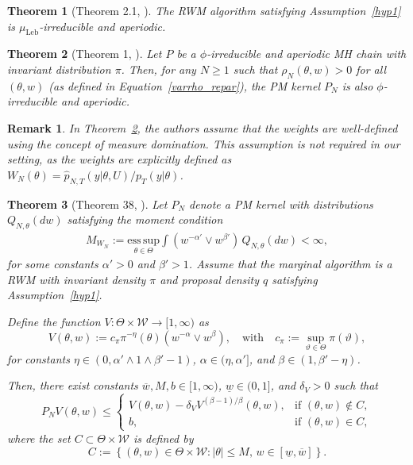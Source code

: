 \documentclass[pdflatex,sn-mathphys-num]{sn-jnl}
\renewcommand{\geq}{\geqslant}
\renewcommand{\leq}{\leqslant}
\theoremstyle{thmstyleone}
\newtheorem{theorem}{Theorem}
\theoremstyle{thmstyletwo}
\newtheorem{remark}{Remark}
\theoremstyle{thmstylethree}
\begin{document}
\begin{theorem}[Theorem 2.1, \cite{jarner_geometric_2000}]
The RWM algorithm satisfying Assumption~\ref{hyp1} is $\mu_{\text{Leb}}$-irreducible and aperiodic.
    \label{appendix:thm1}
\end{theorem}

\begin{theorem}[Theorem 1, \cite{andrieu_pseudo-marginal_2009}]
Let $P$ be a $\phi$-irreducible and aperiodic MH chain with invariant distribution $\pi$. Then, for any $N \geq 1$ such that $\rho_N(\theta, w) > 0$ for all $(\theta, w)$ (as defined in Equation~\eqref{varrho_repar}), the PM kernel $P_N$ is also $\phi$-irreducible and aperiodic.
\label{appendix:thm2}
\end{theorem}

\begin{remark}
In Theorem~\ref{appendix:thm2}, the authors assume that the weights are well-defined using the concept of measure domination. This assumption is not required in our setting, as the weights are explicitly defined as $W_N(\theta) = \widehat{p}_{N,T}(y| \theta, U) / p_T(y| \theta)$.
\end{remark}

\begin{theorem}[Theorem 38, \cite{andrieu_convergence_2015}]
Let \( P_N \) denote a PM kernel with distributions \( Q_{N,\theta}(dw) \) satisfying the moment condition
\begin{align}
    M_{W_N} := \underset{\theta \in \Theta}{\mathrm{ess\,sup}} \int (w^{-\alpha'} \vee w^{\beta'})\, Q_{N,\theta}(dw) < \infty,
\label{appendix:moments}
\end{align}
for some constants \( \alpha' > 0 \) and \( \beta' > 1 \). Assume that the marginal algorithm is a RWM with invariant density \( \pi \) and proposal density \( q \) satisfying Assumption~\ref{hyp1}.

Define the function \( V: \Theta \times \mathcal{W} \to [1,\infty) \) as
\[
V(\theta,w) := c_\pi \pi^{-\eta}(\theta)\left(w^{-\alpha} \vee w^{\beta}\right), \quad \text{with} \quad c_\pi := \sup_{\vartheta \in \Theta} \pi(\vartheta),
\]
for constants \( \eta \in (0, \alpha' \wedge 1 \wedge \beta'-1) \), \( \alpha \in (\eta, \alpha'] \), and \( \beta \in (1, \beta' - \eta) \).

Then, there exist constants \( \overline{w}, M, b \in [1, \infty) \), \( \underline{w} \in (0,1] \), and \( \delta_V > 0 \) such that
\[
P_N V(\theta,w) \leq 
\begin{cases}
V(\theta,w) - \delta_V V^{(\beta-1)/\beta}(\theta,w), & \text{if } (\theta,w) \notin C, \\
b, & \text{if } (\theta,w) \in C,
\end{cases}
\]
where the set \( C \subset \Theta \times \mathcal{W} \) is defined by
\[
C := \left\{ (\theta, w) \in \Theta \times \mathcal{W} : |\theta| \leq M, \, w \in [\underline{w}, \overline{w}] \right\}.
\]
\label{appendix:thm3}
\end{theorem}
\end{document}
